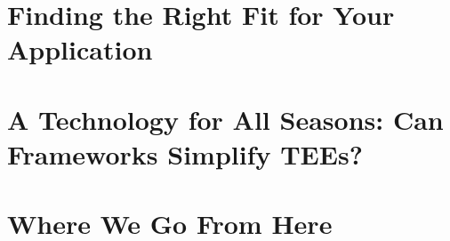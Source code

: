 \section{Finding the Right Fit for Your Application}
\section{A Technology for All Seasons: Can Frameworks Simplify TEEs?}
\section{Where We Go From Here}